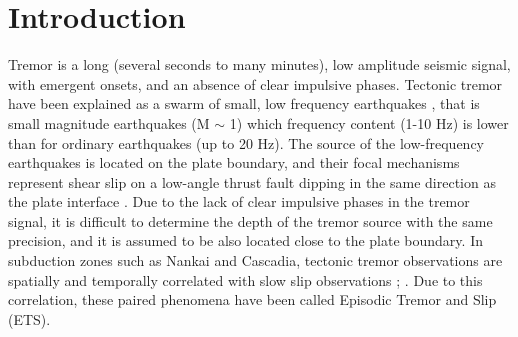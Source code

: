 \documentclass[draft]{agujournal2019}
\begin{document}

%
%
%
%


\section{Introduction}

Tremor is a long (several seconds to many minutes), low amplitude seismic signal, with emergent onsets, and an absence of clear impulsive phases. Tectonic tremor have been explained as a swarm of small, low frequency earthquakes \cite{SHE_2007_nature}, that is small magnitude earthquakes (M $\sim$ 1) which frequency content (1-10 Hz) is lower than for ordinary earthquakes (up to 20 Hz). The source of the low-frequency earthquakes is located on the plate boundary, and their focal mechanisms represent shear slip on a low-angle thrust fault dipping in the same direction as the plate interface \cite{IDE_2007_GRL}. Due to the lack of clear impulsive phases in the tremor signal, it is difficult to determine the depth of the tremor source with the same precision, and it is assumed to be also located close to the plate boundary. In subduction zones such as Nankai and Cascadia, tectonic tremor observations are spatially and temporally correlated with slow slip observations \cite{OBA_2002}; \cite{ROG_2003}. Due to this correlation, these paired phenomena have been called Episodic Tremor and Slip (ETS). \\
\end{document}

